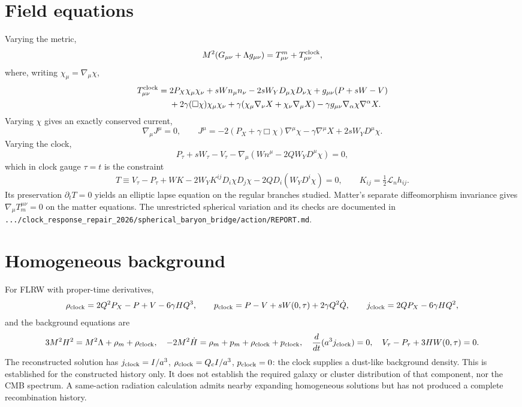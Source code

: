 \documentclass[11pt,letterpaper]{article}
\begin{document}
\section{Field equations}
Varying the metric,
\begin{equation}
M^2(G_{\mu\nu}+\Lambda g_{\mu\nu})=T^m_{\mu\nu}+T^{\rm clock}_{\mu\nu},
\end{equation}
where, writing $\chi_\mu=\nabla_\mu\chi$,
\begin{align}
T^{\rm clock}_{\mu\nu}={}&2P_X\chi_\mu\chi_\nu+sWn_\mu n_\nu-2sW_YD_\mu\chi D_\nu\chi+g_{\mu\nu}(P+sW-V)\notag\\
&+2\gamma(\Box\chi)\chi_\mu\chi_\nu+\gamma(\chi_\mu\nabla_\nu X+\chi_\nu\nabla_\mu X)-\gamma g_{\mu\nu}\nabla_\alpha\chi\nabla^\alpha X.
\end{align}
Varying $\chi$ gives an exactly conserved current,
\begin{equation}
\nabla_\mu J^\mu=0,\qquad J^\mu=-2(P_X+\gamma\Box\chi)\nabla^\mu\chi-\gamma\nabla^\mu X+2sW_YD^\mu\chi .
\end{equation}
Varying the clock,
\begin{equation}
P_\tau+sW_\tau-V_\tau-\nabla_\mu\!\left(Wn^\mu-2QW_YD^\mu\chi\right)=0,
\end{equation}
which in clock gauge $\tau=t$ is the constraint
\begin{equation}
T\equiv V_\tau-P_\tau+WK-2W_YK^{ij}D_i\chi D_j\chi-2QD_i(W_YD^i\chi)=0,\qquad K_{ij}=\tfrac12\mathcal L_nh_{ij}.
\end{equation}
Its preservation $\partial_tT=0$ yields an elliptic lapse equation on the regular branches studied. Matter's separate diffeomorphism invariance gives $\nabla_\mu T_m^{\mu\nu}=0$ on the matter equations. The unrestricted spherical variation and its checks are documented in \texttt{.../clock\_response\_repair\_2026/spherical\_baryon\_bridge/action/REPORT.md}.

\section{Homogeneous background}
For FLRW with proper-time derivatives,
\begin{equation}
\rho_{\rm clock}=2Q^2P_X-P+V-6\gamma HQ^3,\qquad p_{\rm clock}=P-V+sW(0,\tau)+2\gamma Q^2\dot Q,\qquad j_{\rm clock}=2QP_X-6\gamma HQ^2,
\end{equation}
and the background equations are
\begin{equation}
3M^2H^2=M^2\Lambda+\rho_m+\rho_{\rm clock},\quad -2M^2\dot H=\rho_m+p_m+\rho_{\rm clock}+p_{\rm clock},\quad \frac{d}{dt}(a^3j_{\rm clock})=0,\quad V_\tau-P_\tau+3HW(0,\tau)=0 .
\end{equation}
The reconstructed solution has $j_{\rm clock}=I/a^3$, $\rho_{\rm clock}=Q_cI/a^3$, $p_{\rm clock}=0$: the clock supplies a dust-like background density. This is established for the constructed history only. It does not establish the required galaxy or cluster distribution of that component, nor the CMB spectrum. A same-action radiation calculation admits nearby expanding homogeneous solutions but has not produced a complete recombination history.
\end{document}
